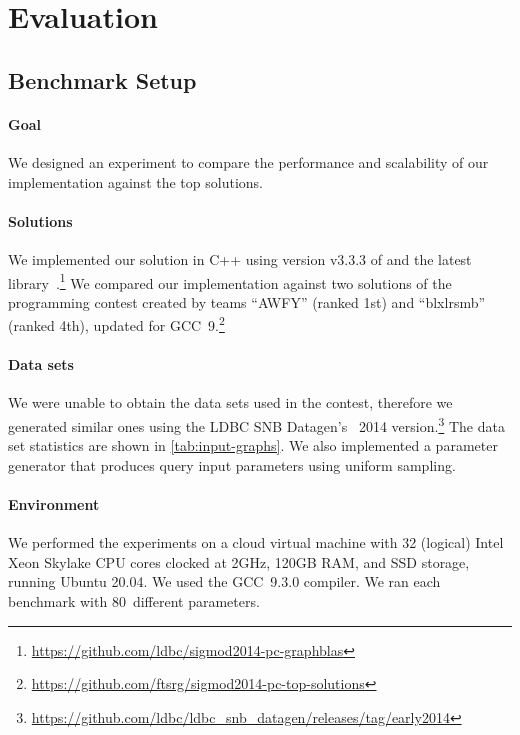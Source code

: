 \section{Evaluation}
\label{sec:evaluation}





\subsection{Benchmark Setup}

\paragraph{Goal}
%
We designed an experiment to compare the performance and scalability of our implementation against the top solutions.

\paragraph{Solutions}
%
We implemented our solution in C++ using version v3.3.3 of \gxb and the latest \lagraph library~\cite{DBLP:conf/ipps/MattsonDKBMMY19}.\footnote{\url{https://github.com/ldbc/sigmod2014-pc-graphblas}}
We compared our implementation against two solutions of the programming contest created by teams ``AWFY'' (ranked 1st) and ``blxlrsmb'' (ranked 4th), updated for GCC~9.\footnote{\url{https://github.com/ftsrg/sigmod2014-pc-top-solutions}}


\paragraph{Data sets}
%
We were unable to obtain the data sets used in the contest, therefore we generated similar ones using the LDBC SNB Datagen's~\cite{DBLP:conf/tpctc/PhamBE12} 2014 version.\footnote{\url{https://github.com/ldbc/ldbc_snb_datagen/releases/tag/early2014}} The data set statistics are shown in \autoref{tab:input-graphs}.
We also implemented a parameter generator that produces query input parameters using uniform sampling.

\paragraph{Environment}
%
We performed the experiments on a cloud virtual machine with 32 (logical)  Intel Xeon Skylake CPU cores clocked at 2GHz, 120GB RAM, and SSD storage, running Ubuntu 20.04. We used the GCC~9.3.0 compiler.
We ran each benchmark with 80~different parameters.

